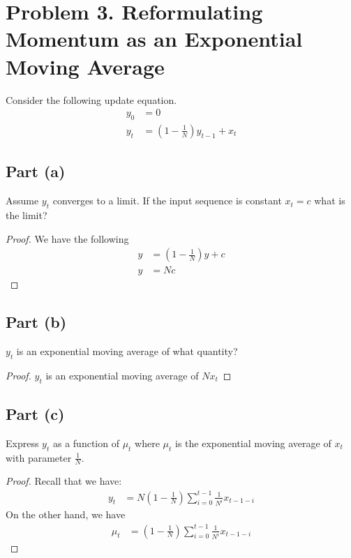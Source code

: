 \documentclass{amsart}
\theoremstyle{definition}
\begin{document}
\section*{Problem 3. Reformulating Momentum as an Exponential Moving Average}
Consider the following update equation.
\begin{align*}
    y_0 &= 0 \\
    y_t &= \left(1 - \frac1{N}\right)y_{t - 1} + x_t
\end{align*}
\subsection*{Part (a)}
Assume $y_t$ converges to a limit. If the input sequence is constant $x_t = c$ what is the limit?
\begin{proof}
    We have the following
    \begin{align*}
        y &= \left(1 - \frac1{N}\right) y + c \\
        y &= N c
    \end{align*}
\end{proof}

\subsection*{Part (b)} $y_t$ is an exponential moving average of what quantity?

\begin{proof}
$y_t$ is an exponential moving average of $N x_t$   
\end{proof}

\subsection*{Part (c)} Express $y_t$ as a function of $\mu_t$ where $\mu_t$ is the exponential moving average of $x_t$ with parameter $\frac1{N}$. 

\begin{proof}
    Recall that we have:
    \begin{align*}
        y_t &= N(1 - \frac1{N}) \sum_{i = 0}^{t - 1} \frac1{N^i}  x_{t - 1 - i} 
    \end{align*}
    On the other hand, we have
    \begin{align*}
        \mu_t &= \left(1 - \frac1{N}\right) \sum_{i = 0}^{t - 1} \frac1{N^i} x_{t - 1 - i} 
    \end{align*}
\end{proof}
\end{document}
